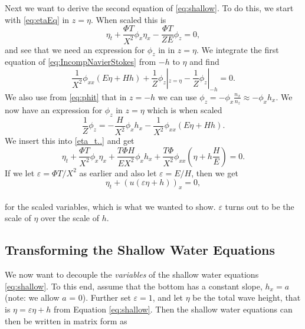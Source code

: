 \documentclass[11pt]{article}
\begin{document}
Next we want to derive the second equation of \eqref{eq:shallow}. To do this, we start with \eqref{eq:etaEq} in $z = \eta$. When scaled this is 
\begin{equation}
    \label{eta_t..}
    \eta_t + \frac{\Phi T}{X^2}\phi_x\eta_x - \frac{\Phi T}{ZE}\phi_z = 0,
\end{equation}
and see that we need an expression for $\phi_z$ in in $z = \eta$. We integrate the first equation of \eqref{eq:IncompNavierStokes} from $-h$ to $\eta$ and find 
\begin{equation*}    
    \frac{1}{X^2}\phi_{xx}(E\eta + Hh) + \frac{1}{Z}\phi_z|_{z=\eta} - \frac{1}{Z}\phi_z|_{-h} = 0.
\end{equation*}
We also use from \eqref{eq:phit} that in $z = -h$ we can use $\phi_z = -\phi_x\frac{n_x}{n_z} \approx -\phi_x h_x$. We now have an expression for $\phi_z$ in $z = \eta$ which is when scaled
\begin{equation*}
    \frac{1}{Z}\phi_z = - \frac{H}{X^2}\phi_x h_x - \frac{1}{X^2}\phi_{xx}(E\eta + Hh).
\end{equation*}
We insert this into \eqref{eta_t..} and get
\begin{equation*} 
    \eta_t + \frac{\Phi T}{X^2}\phi_x\eta_x + \frac{T\Phi H}{EX^2}\phi_x h_x + \frac{T\Phi}{X^2}\phi_{xx}(\eta + h\frac{H}{E}) = 0.
\end{equation*}
If we let $\varepsilon = \Phi T/X^2 $ as earlier and also let $\varepsilon = E/H$, then we get
\begin{equation*}
\eta_t + (u(\varepsilon\eta + h))_x = 0,
\end{equation*}\\

for the scaled variables, which is what we wanted to show. $\varepsilon$ turns out to be the scale of $\eta$ over the scale of $h$.
%
%
\subsection{Transforming the Shallow Water Equations}
We now want to decouple the \emph{variables} of the shallow water equations \eqref{eq:shallow}. To this end, 
assume that the bottom has a constant slope, $h_x = a$ (note: we allow $a$ = 0). Further set $\varepsilon =1$,
and let $\eta$ be the total wave height, that is $\eta = \varepsilon\eta + h$ from Equation \eqref{eq:shallow}.
Then the shallow water equations can then be written in matrix form as
\end{document}
